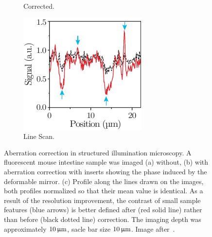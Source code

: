 \begin{figure}[htb]
\begin{subfigure}[b]{0.25\textwidth}
                \caption{Corrected.}
                \label{fig:SI_corrected}
        \end{subfigure}
        \begin{subfigure}[b]{0.25\textwidth}
                \includegraphics[width=\textwidth]{images/structured_illumination_scan}
                \caption{Line Scan.}
                \label{fig:SI_scan}
        \end{subfigure}
								
        \caption{Aberration correction in structured illumination microscopy. A fluorescent mouse intestine sample was imaged (a) without, (b) with aberration correction with inserts showing the phase induced by the deformable mirror. (c) Profile along the lines drawn on the images, both profiles normalized so that their mean value is identical. As a result of the resolution improvement, the contrast of small sample features (blue arrows) is better defined after (red solid line) rather than before (black dotted line) correction. The imaging depth was approximately $\unit[10]{\upmu m}$, sacle bar size $\unit[10]{\upmu m}$. Image after~\cite{wide_AOM_structured_illu}.}
\label{fig:structured_light_correction}
\end{figure} 

